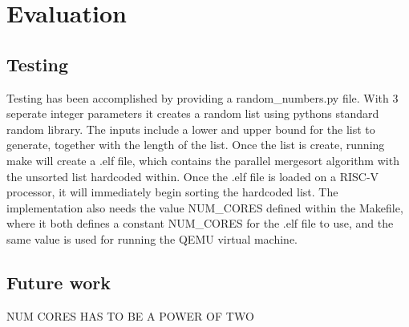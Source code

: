 \section{Evaluation}

\subsection{Testing}
Testing has been accomplished by providing a random\_numbers.py file. With 3
seperate integer parameters it creates a random list using pythons standard
random library. The inputs include a lower and upper bound for the list to
generate, together with the length of the list. Once the list is create, running
make will create a .elf file, which contains the parallel mergesort algorithm
with the unsorted list hardcoded within. Once the .elf file is loaded on a
RISC-V processor, it will immediately begin sorting the hardcoded list. The
implementation also needs the value NUM\_CORES defined within the Makefile,
where it both defines a constant NUM\_CORES for the .elf file to use, and the
same value is used for running the QEMU virtual machine.


\subsection{Future work}
NUM CORES HAS TO BE A POWER OF TWO


